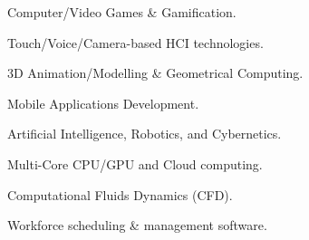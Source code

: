 

\begin{cventries}


  \cventry
    {} 
    {}
    {}
    {}
    {    	
	  \vspace{-1.7cm}
      \begin{multicols}{2}
      \begin{cvitems}
		\item {Computer/Video Games \& Gamification.}      
        \item {Touch/Voice/Camera-based HCI technologies.}
        \item {3D Animation/Modelling \& Geometrical Computing.}
        \item {Mobile Applications Development.}
        \item {Artificial Intelligence, Robotics, and Cybernetics.}
        \item {Multi-Core CPU/GPU and Cloud computing.}
        \item {Computational Fluids Dynamics (CFD).}
        \item {Workforce scheduling \& management software.}
      \end{cvitems}
	  \end{multicols}
	  \vspace{-0.5cm}
    }

\end{cventries}
